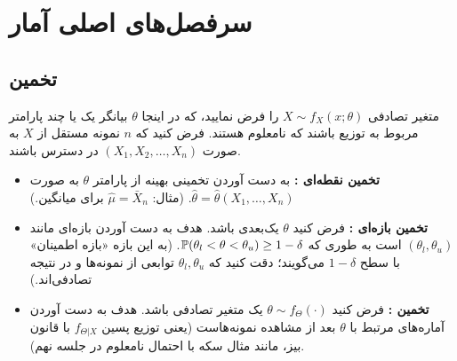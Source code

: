 \begin{center}
\end{center}

\section{سرفصل‌های اصلی آمار}

\subsection{تخمین }
متغیر تصادفی $X\sim f_X(x;\theta)$ را فرض نمایید، که در اینجا $\theta$ بیانگر یک یا چند پارامتر مربوط به توزیع باشند که \textcolor{red!70!black}{نامعلوم} هستند. فرض کنید که $n$ نمونه مستقل از $X$ به صورت $(X_1,X_2,\ldots,X_n)$ در دسترس باشند.
\begin{itemize}
\item \textbf{تخمین نقطه‌ای :} به دست آوردن تخمینی \textcolor{red!70!black}{بهینه} از پارامتر $\theta$ به صورت $\hat\theta=\hat\theta(X_1,\ldots,X_n)$. (مثال: $\hat\mu=\bar X_n$ برای میانگین.)
\item \textbf{تخمین بازه‌ای :} فرض کنید $\theta$ یک‌بعدی باشد. هدف به دست آوردن بازه‌ای مانند $(\theta_l,\theta_u)$ است به طوری که $\mathbb{P}(\theta_l<\theta<\theta_u)\ge1-\delta$. (به این بازه «بازه اطمینان» با سطح $1-\delta$ می‌گویند؛ دقت کنید که $\theta_l,\theta_u$ توابعی از نمونه‌ها و در نتیجه تصادفی‌اند.)
\item \textbf{تخمین :} فرض کنید $\theta\sim f_\Theta(\cdot)$ یک متغیر تصادفی باشد. هدف به دست آوردن آماره‌های مرتبط با $\theta$ بعد از مشاهده نمونه‌هاست (یعنی توزیع پسین $f_{\Theta|X}$ با قانون بیز، مانند مثال سکه با احتمال نامعلوم در جلسه نهم).
\end{itemize}

